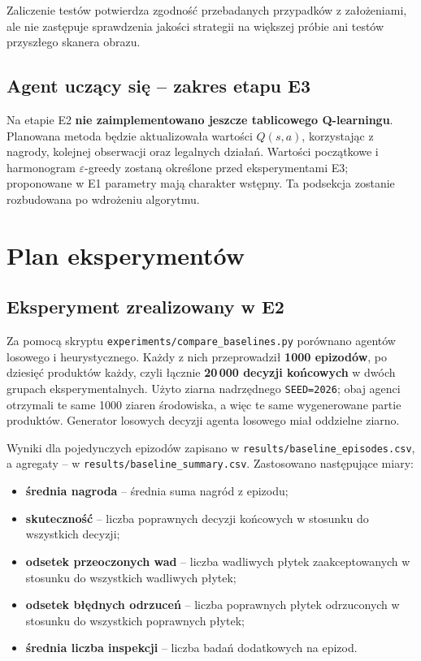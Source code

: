 \documentclass[12pt]{article}
\begin{document}
Zaliczenie testów potwierdza zgodność przebadanych przypadków z założeniami, ale nie zastępuje sprawdzenia jakości strategii na większej próbie ani testów przyszłego skanera obrazu.

\subsection{Agent uczący się -- zakres etapu E3}

Na etapie E2 \textbf{nie zaimplementowano jeszcze tablicowego Q-learningu}. Planowana metoda będzie aktualizowała wartości \(Q(s,a)\), korzystając z nagrody, kolejnej obserwacji oraz legalnych działań. Wartości początkowe i harmonogram \(\varepsilon\)-greedy zostaną określone przed eksperymentami E3; proponowane w E1 parametry mają charakter wstępny. Ta podsekcja zostanie rozbudowana po wdrożeniu algorytmu.

\section{Plan eksperymentów}

\subsection{Eksperyment zrealizowany w E2}

Za pomocą skryptu \texttt{experiments/compare\_baselines.py} porównano agentów losowego i heurystycznego. Każdy z nich przeprowadził \textbf{1000 epizodów}, po dziesięć produktów każdy, czyli łącznie \textbf{20\,000 decyzji końcowych} w dwóch grupach eksperymentalnych. Użyto ziarna nadrzędnego \texttt{SEED=2026}; obaj agenci otrzymali te same 1000 ziaren środowiska, a więc te same wygenerowane partie produktów. Generator losowych decyzji agenta losowego miał oddzielne ziarno.

Wyniki dla pojedynczych epizodów zapisano w \texttt{results/baseline\_episodes.csv}, a agregaty -- w \texttt{results/baseline\_summary.csv}. Zastosowano następujące miary:
\begin{itemize}[nosep]
    \item \textbf{średnia nagroda} -- średnia suma nagród z epizodu;
    \item \textbf{skuteczność} -- liczba poprawnych decyzji końcowych w stosunku do wszystkich decyzji;
    \item \textbf{odsetek przeoczonych wad} -- liczba wadliwych płytek zaakceptowanych w stosunku do wszystkich wadliwych płytek;
    \item \textbf{odsetek błędnych odrzuceń} -- liczba poprawnych płytek odrzuconych w stosunku do wszystkich poprawnych płytek;
    \item \textbf{średnia liczba inspekcji} -- liczba badań dodatkowych na epizod.
\end{itemize}
\end{document}
